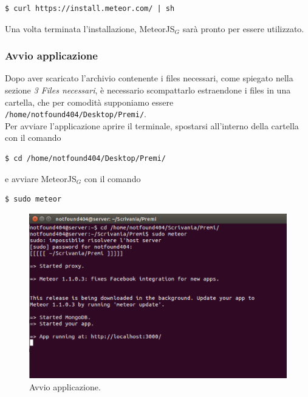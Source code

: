 \begin{lstlisting}[style=DOS]
	$ curl https://install.meteor.com/ | sh
\end{lstlisting}

\noindent Una volta terminata l'installazione, MeteorJS$_G$ sarà pronto per essere utilizzato.

\subsubsection{Avvio applicazione}
Dopo aver scaricato l'archivio contenente i files necessari, come spiegato nella sezione \emph{3 Files necessari}, è necessario scompattarlo estraendone i files in una cartella, che per comodità supponiamo essere \verb+/home/notfound404/Desktop/Premi/+.\\
Per avviare l'applicazione aprire il terminale, spostarsi all'interno della cartella con il comando

\begin{lstlisting}[style=DOS]
	$ cd /home/notfound404/Desktop/Premi/
\end{lstlisting}

\noindent e avviare MeteorJS$_G$ con il comando 

\begin{lstlisting}[style=DOS]
	$ sudo meteor
\end{lstlisting}

\begin{figure}[!h]
\begin{center}
\includegraphics[scale=0.4]{img/start_premi.png}
\caption{Avvio applicazione.}
\end{center}
\end{figure}

